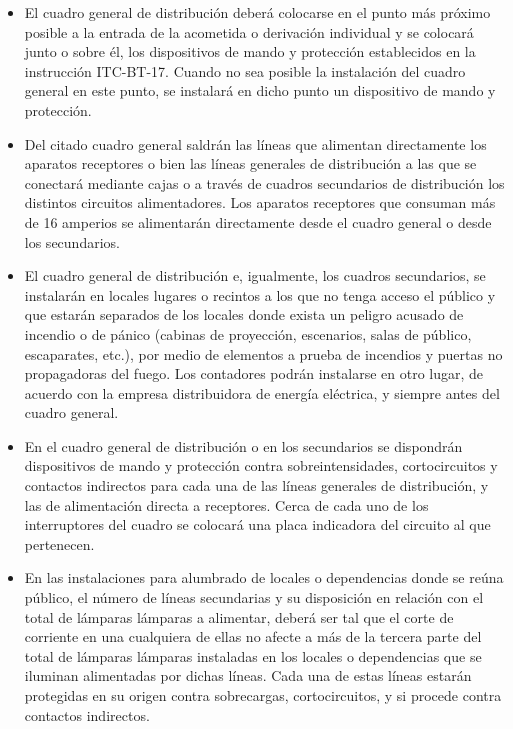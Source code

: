 \begin{itemize}
\item El cuadro general de distribución deberá colocarse en el punto más próximo posible a la entrada de la acometida o derivación individual y se colocará junto o sobre él, los dispositivos de mando y protección establecidos en la instrucción ITC-BT-17. Cuando no sea posible la instalación del cuadro general en este punto, se instalará en dicho punto un dispositivo de mando y protección.\\

\item Del citado cuadro general saldrán las líneas que alimentan directamente los aparatos receptores o bien las líneas generales de distribución a las que se conectará mediante cajas o a través de cuadros secundarios de distribución los distintos circuitos alimentadores. Los aparatos receptores que consuman más de 16 amperios se alimentarán directamente desde el cuadro general o desde los secundarios.

\item El cuadro general de distribución e, igualmente, los cuadros secundarios, se instalarán en locales lugares o recintos a los que no tenga acceso el público y que estarán separados de los locales donde exista un peligro acusado de incendio o de pánico (cabinas de proyección, escenarios, salas de público, escaparates, etc.), por medio de elementos a prueba de incendios y puertas no propagadoras del fuego. Los contadores podrán instalarse en otro lugar, de acuerdo con la empresa distribuidora de energía eléctrica, y siempre antes del cuadro general.

\item En el cuadro general de distribución o en los secundarios se dispondrán dispositivos de mando y protección contra sobreintensidades, cortocircuitos y contactos indirectos para cada una de las líneas generales de distribución, y las de alimentación directa a receptores. Cerca de cada uno de los interruptores del cuadro se colocará una placa indicadora del circuito al que pertenecen.

\item En las instalaciones para alumbrado de locales o dependencias donde se reúna público, el número de líneas secundarias y su disposición en relación con el total de lámparas lámparas a alimentar, deberá ser tal que el corte de corriente en una cualquiera de ellas no afecte a más de la tercera parte del total de lámparas lámparas instaladas en los locales o dependencias que se iluminan alimentadas por dichas líneas. Cada una de estas líneas estarán protegidas en su origen contra sobrecargas, cortocircuitos, y si procede contra contactos indirectos.

\end{itemize}

